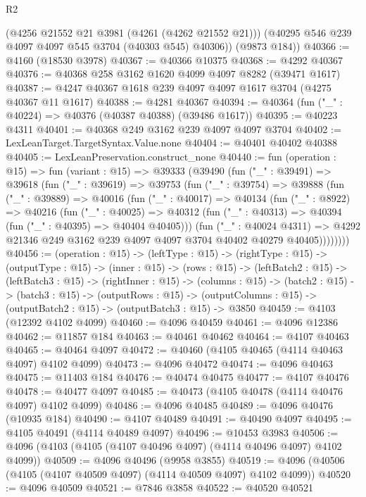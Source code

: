 \begin{lexlean}{R2}
\begin{coremodule}
        (@4256 @21552 @21 @3981 (@4261 (@4262 @21552 @21)))
        (@40295 @546 @239 @4097 @4097 @545 @3704 (@40303 @545) @40306))
      (@9873 @184))
@40366 := @4160 (@18530 @3978)
@40367 := @40366 @10375
@40368 := @4292 @40367
@40376 := @40368 @258 @3162 @1620 @4099 @4097 @8282 (@39471 @1617)
@40387 := @4247 @40367 @1618 @239 @4097 @4097 @1617 @3704 (@4275 @40367 @11 @1617)
@40388 := @4281 @40367
@40394 := @40364 (fun ("_" : @40224) => @40376 (@40387 @40388) (@39486 @1617))
@40395 := @40223 @4311
@40401 := @40368 @249 @3162 @239 @4097 @4097 @3704
@40402 := LexLeanTarget.TargetSyntax.Value.none
@40404 := @40401 @40402 @40388
@40405 := LexLeanPreservation.construct_none
@40440 := fun (operation : @15) =>
  fun (variant : @15) =>
  @39333
    (@39490
      (fun ("_" : @39491) =>
      @39618
        (fun ("_" : @39619) =>
        @39753
          (fun ("_" : @39754) =>
          @39888
            (fun ("_" : @39889) =>
            @40016
              (fun ("_" : @40017) =>
              @40134
                (fun ("_" : @8922) =>
                @40216
                  (fun ("_" : @40025) =>
                  @40312 (fun ("_" : @40313) => @40394 (fun ("_" : @40395) => @40404 @40405)))
                  (fun ("_" : @40024 @4311) =>
                  @4292 @21346 @249 @3162 @239 @4097 @4097 @3704 @40402 @40279 @40405))))))))
@40456 := (operation : @15) ->
  (leftType : @15) ->
  (rightType : @15) ->
  (outputType : @15) ->
  (inner : @15) ->
  (rows : @15) ->
  (leftBatch2 : @15) ->
  (leftBatch3 : @15) ->
  (rightInner : @15) ->
  (columns : @15) ->
  (batch2 : @15) ->
  (batch3 : @15) ->
  (outputRows : @15) ->
  (outputColumns : @15) -> (outputBatch2 : @15) -> (outputBatch3 : @15) -> @3850
@40459 := @4103 (@12392 @4102 @4099)
@40460 := @4096 @40459
@40461 := @4096 @12386
@40462 := @11857 @184
@40463 := @40461 @40462
@40464 := @4107 @40463
@40465 := @40464 @4097
@40472 := @40460 (@4105 @40465 (@4114 @40463 @4097) @4102 @4099)
@40473 := @4096 @40472
@40474 := @4096 @40463
@40475 := @11403 @184
@40476 := @40474 @40475
@40477 := @4107 @40476
@40478 := @40477 @4097
@40485 := @40473 (@4105 @40478 (@4114 @40476 @4097) @4102 @4099)
@40486 := @4096 @40485
@40489 := @4096 @40476 (@10935 @184)
@40490 := @4107 @40489
@40491 := @40490 @4097
@40495 := @4105 @40491 (@4114 @40489 @4097)
@40496 := @10453 @3983
@40506 := @4096 (@4103 (@4105 (@4107 @40496 @4097) (@4114 @40496 @4097) @4102 @4099))
@40509 := @4096 @40496 (@9958 @3855)
@40519 := @4096 (@40506 (@4105 (@4107 @40509 @4097) (@4114 @40509 @4097) @4102 @4099))
@40520 := @4096 @40509
@40521 := @7846 @3858
@40522 := @40520 @40521

\end{coremodule}
\end{lexlean}
